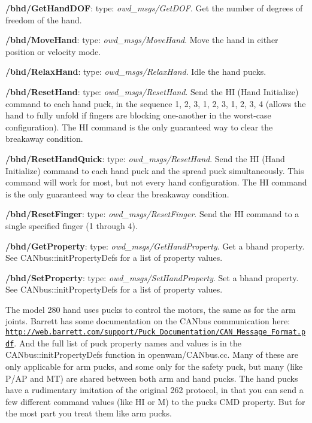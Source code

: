 \begin{DoxyItemize}
\item {\bfseries /bhd/\-Get\-Hand\-D\-O\-F}\-: type\-: {\itshape owd\-\_\-msgs/\-Get\-D\-O\-F}. Get the number of degrees of freedom of the hand.
\item {\bfseries /bhd/\-Move\-Hand}\-: type\-: {\itshape owd\-\_\-msgs/\-Move\-Hand}. Move the hand in either position or velocity mode.
\item {\bfseries /bhd/\-Relax\-Hand}\-: type\-: {\itshape owd\-\_\-msgs/\-Relax\-Hand}. Idle the hand pucks.
\item {\bfseries /bhd/\-Reset\-Hand}\-: type\-: {\itshape owd\-\_\-msgs/\-Reset\-Hand}. Send the H\-I (Hand Initialize) command to each hand puck, in the sequence 1, 2, 3, 1, 2, 3, 1, 2, 3, 4 (allows the hand to fully unfold if fingers are blocking one-\/another in the worst-\/case configuration). The H\-I command is the only guaranteed way to clear the breakaway condition.
\item {\bfseries /bhd/\-Reset\-Hand\-Quick}\-: type\-: {\itshape owd\-\_\-msgs/\-Reset\-Hand}. Send the H\-I (Hand Initialize) command to each hand puck and the spread puck simultaneously. This command will work for most, but not every hand configuration. The H\-I command is the only guaranteed way to clear the breakaway condition.
\item {\bfseries /bhd/\-Reset\-Finger}\-: type\-: {\itshape owd\-\_\-msgs/\-Reset\-Finger}. Send the H\-I command to a single specified finger (1 through 4).
\item {\bfseries /bhd/\-Get\-Property}\-: type\-: {\itshape owd\-\_\-msgs/\-Get\-Hand\-Property}. Get a bhand property. See C\-A\-Nbus\-::init\-Property\-Defs for a list of property values.
\item {\bfseries /bhd/\-Set\-Property}\-: type\-: {\itshape owd\-\_\-msgs/\-Set\-Hand\-Property}. Set a bhand property. See C\-A\-Nbus\-::init\-Property\-Defs for a list of property values.
\item The model 280 hand uses pucks to control the motors, the same as for the arm joints. Barrett has some documentation on the C\-A\-Nbus communication here\-: \href{http://web.barrett.com/support/Puck_Documentation/CAN_Message_Format.pdf}{\tt http\-://web.\-barrett.\-com/support/\-Puck\-\_\-\-Documentation/\-C\-A\-N\-\_\-\-Message\-\_\-\-Format.\-pdf}. And the full list of puck property names and values is in the C\-A\-Nbus\-::init\-Property\-Defs function in openwam/\-C\-A\-Nbus.\-cc. Many of these are only applicable for arm pucks, and some only for the safety puck, but many (like P/\-A\-P and M\-T) are shared between both arm and hand pucks. The hand pucks have a rudimentary imitation of the original 262 protocol, in that you can send a few different command values (like H\-I or M) to the pucks C\-M\-D property. But for the most part you treat them like arm pucks.

\end{DoxyItemize}
